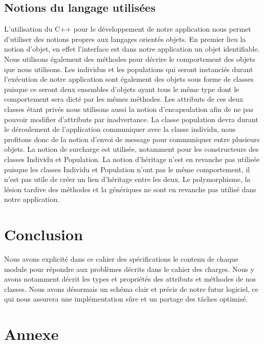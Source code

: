 \documentclass[a4paper,11pt]{article}
\begin{document}
		\subsection{Notions du langage utilisées}
			L’utilisation du C++ pour le développement de notre application nous permet d’utiliser des notions propres aux langages orientés objets.
			En premier lieu la notion d’objet, en effet l’interface est dans notre application un objet identifiable.
			Nous utilisons également des méthodes pour décrire le comportement des objets que nous utilisons.
			Les individus et les populations qui seront instanciés durant l'exécution de notre application sont également des objets sous forme de classes puisque ce seront deux ensembles d’objets ayant tous le même type dont le comportement sera dicté par les mêmes méthodes.
			Les attributs de ces deux classes étant privés nous utilisons aussi la notion d’encapsulation afin de ne pas pouvoir modifier d’attributs par inadvertance.
			La classe population devra durant le déroulement de l’application communiquer avec la classe individu, nous profitons donc de la notion d’envoi de message pour communiquer entre plusieurs objets.
			La notion de surcharge est utilisée, notamment pour les constructeurs des classes Individu et Population.
			La notion d’héritage n’est en revanche pas utilisée puisque les classes Individu et Population n’ont pas le même comportement, il n’est pas utile de créer un lien d’héritage entre les deux.
			Le polymorphisme, la lésion tardive des méthodes et la génériques ne sont en revanche pas utilisé dans notre application.\\

	
	\section{Conclusion}	
		Nous avons explicité dans ce cahier des spécifications le contenu de chaque module pour répondre aux problèmes décrits dans le cahier des charges.
		Nous y avons notamment décrit les types et propriétés des attributs et méthodes de nos classes.
		Nous avons désormais un schéma clair et précis de notre futur logiciel, ce qui nous assurera une implémentation sûre et un partage des tâches optimisé.
		
	\newpage
	\section{Annexe}
\end{document}
